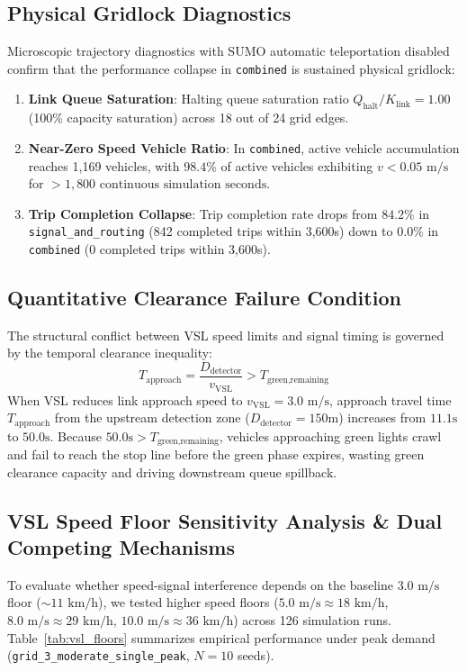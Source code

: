 \documentclass[3p,times,procedia]{elsarticle}
\begin{document}
\subsection{Physical Gridlock Diagnostics}
Microscopic trajectory diagnostics with SUMO automatic teleportation disabled confirm that the performance collapse in \texttt{combined} is sustained physical gridlock:
\begin{enumerate}
    \item \textbf{Link Queue Saturation}: Halting queue saturation ratio $Q_{\text{halt}}/K_{\text{link}} = 1.00$ (100\% capacity saturation) across 18 out of 24 grid edges.
    \item \textbf{Near-Zero Speed Vehicle Ratio}: In \texttt{combined}, active vehicle accumulation reaches 1,169 vehicles, with $98.4\%$ of active vehicles exhibiting $v < 0.05\text{ m/s}$ for $>1,800\text{ continuous simulation seconds}$.
    \item \textbf{Trip Completion Collapse}: Trip completion rate drops from $84.2\%$ in \texttt{signal\_and\_routing} (842 completed trips within 3,600s) down to $0.0\%$ in \texttt{combined} (0 completed trips within 3,600s).
\end{enumerate}

\subsection{Quantitative Clearance Failure Condition}
The structural conflict between VSL speed limits and signal timing is governed by the temporal clearance inequality:
\begin{equation}
T_{\text{approach}} = \frac{D_{\text{detector}}}{v_{\text{VSL}}} > T_{\text{green,remaining}}
\end{equation}
When VSL reduces link approach speed to $v_{\text{VSL}} = 3.0\text{ m/s}$, approach travel time $T_{\text{approach}}$ from the upstream detection zone ($D_{\text{detector}} = 150\text{m}$) increases from $11.1\text{s}$ to $50.0\text{s}$. Because $50.0\text{s} > T_{\text{green,remaining}}$, vehicles approaching green lights crawl and fail to reach the stop line before the green phase expires, wasting green clearance capacity and driving downstream queue spillback.

\subsection{VSL Speed Floor Sensitivity Analysis \& Dual Competing Mechanisms}
To evaluate whether speed-signal interference depends on the baseline $3.0\text{ m/s}$ floor ($\sim 11\text{ km/h}$), we tested higher speed floors ($5.0\text{ m/s} \approx 18\text{ km/h}$, $8.0\text{ m/s} \approx 29\text{ km/h}$, $10.0\text{ m/s} \approx 36\text{ km/h}$) across 126 simulation runs. Table~\ref{tab:vsl_floors} summarizes empirical performance under peak demand (\texttt{grid\_3\_moderate\_single\_peak}, $N=10$ seeds).
\end{document}
